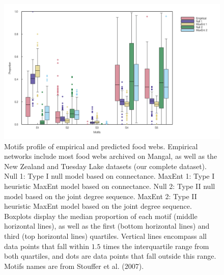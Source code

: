 \documentclass[10pt,oneside]{article}
\makeatletter
\def\maxwidth{\ifdim\Gin@nat@width>\linewidth\linewidth
\else\Gin@nat@width\fi}
\let\Oldincludegraphics\includegraphics
\renewcommand{\includegraphics}[1]{\Oldincludegraphics[width=\maxwidth]{#1}}
\makeatother
\begin{document}
\begin{figure}
\hypertarget{fig:motifs}{%
\centering
\includegraphics{figures/motifs_distribution.png}
\caption{Motifs profile of empirical and predicted food webs. Empirical
networks include most food webs archived on Mangal, as well as the New
Zealand and Tuesday Lake datasets (our complete dataset). Null 1: Type I
null model based on connectance. MaxEnt 1: Type I heuristic MaxEnt model
based on connectance. Null 2: Type II null model based on the joint
degree sequence. MaxEnt 2: Type II heuristic MaxEnt model based on the
joint degree sequence. Boxplots display the median proportion of each
motif (middle horizontal lines), as well as the first (bottom horizontal
lines) and third (top horizontal lines) quartiles. Vertical lines
encompass all data points that fall within \(1.5\) times the
interquartile range from both quartiles, and dots are data points that
fall outside this range. Motifs names are from Stouffer et al.
(2007).}\label{fig:motifs}
}
\end{figure}
\end{document}
